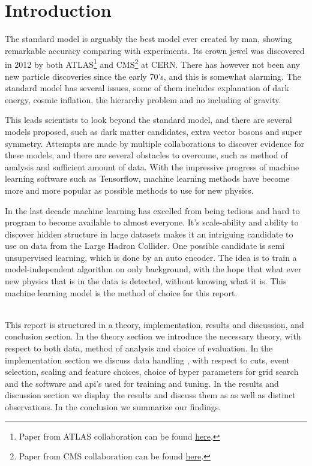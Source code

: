 \documentclass[ reprint, amsmath,amssymb, aps, nofootinbib]{revtex4-2}
\begin{document}
\section{Introduction}
The standard model is arguably the best model ever created by man, showing remarkable accuracy comparing with experiments. Its crown jewel was discovered in 2012 by both ATLAS\footnote{Paper from ATLAS collaboration can be found \href{https://arxiv.org/abs/1207.7214}{here}.} and CMS\footnote{Paper from CMS collaboration can be found \href{https://arxiv.org/abs/1207.7235}{here}.} at CERN. There has however not been any new particle discoveries since the early 70's, and this is somewhat alarming. The standard model has several issues, some of them includes explanation of dark energy, cosmic inflation, the hierarchy problem and no including of gravity. \par 
This leads scientists to look beyond the standard model, and there are several models proposed, such as dark matter candidates, extra vector bosons and super symmetry. Attempts are made by multiple collaborations to discover evidence for these models, and there are several obstacles to overcome, such as method of analysis and sufficient amount of data. With the impressive progress of machine learning software such as Tensorflow\cite{tensorflow2015-whitepaper}, machine learning methods have become more and more popular as possible methods  to use for new physics. \par 
In the last decade machine learning has excelled from being tedious and hard to program to become available to almost everyone. It's scale-ability and ability to discover hidden structure in large datasets makes it an intriguing candidate to use on data from the Large Hadron Collider. One possible candidate is semi unsupervised learning, which is done by an auto encoder. The idea is to train a model-independent algorithm on only background, with the hope that what ever new physics that is in the data is detected, without knowing what it is.  This machine learning model is the method of choice for this report. \par
\\
This report is structured in a theory, implementation, results and discussion, and conclusion section. In the theory section we introduce the necessary theory, with respect to both data, method of analysis and choice of evaluation. In the implementation section we discuss data handling , with respect to cuts, event selection, scaling and feature choices, choice of hyper parameters for grid search and the software and api's used for training and tuning. In the results and discussion section we display the results and discuss them as as well as distinct observations. In the conclusion we summarize our findings. 
\end{document}
